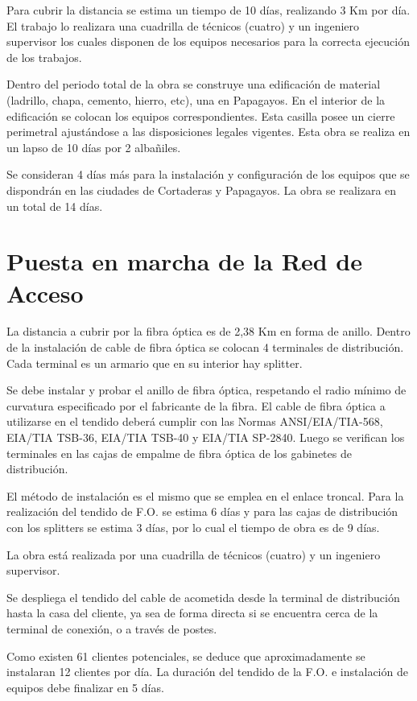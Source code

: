 Para cubrir la distancia se estima un tiempo de 10 días, realizando 3 Km por día. El trabajo lo realizara una cuadrilla de técnicos (cuatro) y un ingeniero supervisor los cuales disponen de los equipos necesarios para la correcta ejecución de los trabajos.

Dentro del periodo total de la obra se construye una edificación de material (ladrillo, chapa, cemento, hierro, etc), una en Papagayos. En el interior de la edificación se colocan los equipos correspondientes. Esta casilla posee un cierre perimetral ajustándose a las disposiciones legales vigentes. Esta obra se realiza en un lapso de 10 días por 2 albañiles.

Se consideran 4 días más para la instalación y configuración de los equipos que se dispondrán en las ciudades de Cortaderas y Papagayos. La obra se realizara en un total de 14 días.

\section{Puesta en marcha de la Red de Acceso}
La distancia a cubrir por la fibra óptica es de 2,38 Km en forma de anillo. Dentro de la instalación de cable de fibra óptica se colocan 4 terminales de distribución. Cada terminal es un armario que en su interior hay splitter.

Se debe instalar y probar el anillo de fibra óptica, respetando el radio mínimo de curvatura especificado por el fabricante de la fibra. El cable de fibra óptica a utilizarse en el tendido deberá cumplir con las Normas  ANSI/EIA/TIA-568, EIA/TIA TSB-36, EIA/TIA TSB-40 y EIA/TIA SP-2840. Luego se verifican los terminales en las cajas de empalme de fibra óptica de los gabinetes de distribución.

El método de instalación es el mismo que se emplea en el enlace troncal. Para la realización del tendido de F.O. se estima 6 días y para las cajas de distribución con los splitters se estima 3 días, por lo cual el tiempo de obra es de 9 días.

La obra está realizada por una cuadrilla de técnicos (cuatro) y un ingeniero supervisor.

Se despliega el tendido del cable de acometida desde la terminal de distribución hasta la casa del cliente, ya sea de forma directa si se encuentra cerca de la terminal de conexión, o a través de postes.

Como existen 61 clientes potenciales, se deduce que aproximadamente se instalaran 12 clientes por día. La duración del tendido de la F.O. e instalación de equipos debe finalizar en 5 días.
